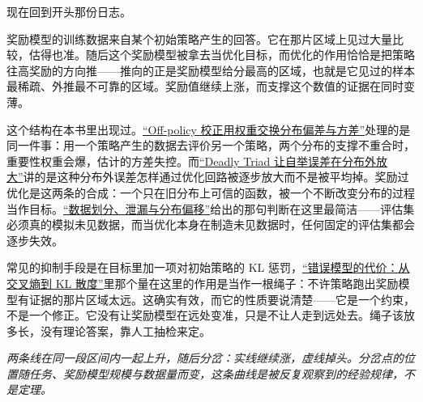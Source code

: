 现在回到开头那份日志。

奖励模型的训练数据来自某个初始策略产生的回答。它在那片区域上见过大量比较，估得也准。随后这个奖励模型被拿去当优化目标，而优化的作用恰恰是把策略往高奖励的方向推——推向的正是奖励模型给分最高的区域，也就是它见过的样本最稀疏、外推最不可靠的区域。奖励值继续上涨，而支撑这个数值的证据在同时变薄。

这个结构在本书里出现过。\hyperref[sec:16-Control-and-Reinforcement-Learning/02-Reinforcement-Learning/08]{``Off-policy 校正用权重交换分布偏差与方差''}处理的是同一件事：用一个策略产生的数据去评价另一个策略，两个分布的支撑不重合时，重要性权重会爆，估计的方差失控。而\hyperref[sec:16-Control-and-Reinforcement-Learning/02-Reinforcement-Learning/06]{``Deadly Triad 让自举误差在分布外放大''}讲的是这种分布外误差怎样通过优化回路被逐步放大而不是被平均掉。奖励过优化是这两条的合成：一个只在旧分布上可信的函数，被一个不断改变分布的过程当作目标。\hyperref[sec:13-Machine-Learning/01-Learning-Problems-and-Evaluation/04]{``数据划分、泄漏与分布偏移''}给出的那句判断在这里最简洁——评估集必须真的模拟未见数据，而当优化本身在制造未见数据时，任何固定的评估集都会逐步失效。

常见的抑制手段是在目标里加一项对初始策略的 KL 惩罚，\hyperref[sec:07-Information-Theory/03-Divergences/01]{``错误模型的代价：从交叉熵到 KL 散度''}里那个量在这里的作用是当作一根绳子：不许策略跑出奖励模型有证据的那片区域太远。这确实有效，而它的性质要说清楚——它是一个约束，不是一个修正。它没有让奖励模型在远处变准，只是不让人走到远处去。绳子该放多长，没有理论答案，靠人工抽检来定。

\begin{center}

\emph{两条线在同一段区间内一起上升，随后分岔：实线继续涨，虚线掉头。分岔点的位置随任务、奖励模型规模与数据量而变，这条曲线是被反复观察到的经验规律，不是定理。}
\end{center}

